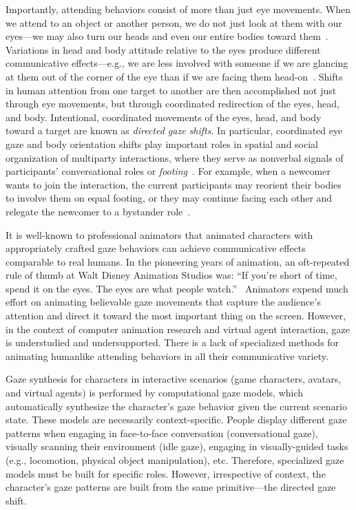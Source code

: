 Importantly, attending behaviors consist of more than just eye movements. When we attend to an object or another person, we do not just look at them with our eyes---we may also turn our heads and even our entire bodies toward them~\citep{langton2000eyes}. Variations in head and body attitude relative to the eyes produce different communicative effects---e.g., we are less involved with someone if we are glancing at them out of the corner of the eye than if we are facing them head-on~\citep{kendon1990conducting,schegloff1998bodytorque}.
Shifts in human attention from one target to another are then accomplished not just through eye movements, but through coordinated redirection of the eyes, head, and body. Intentional, coordinated movements of the eyes, head, and body toward a target are known as \emph{directed gaze shifts}.
In particular, coordinated eye gaze and body orientation shifts play important roles in spatial and social organization of multiparty interactions, where they serve as nonverbal signals of participants' conversational roles or \emph{footing}~\citep{goffman1979footing}. For example, when a newcomer wants to join the interaction, the current participants may reorient their bodies to involve them on equal footing, or they may continue facing each other and relegate the newcomer to a bystander role~\citep{kendon1990conducting}.

It is well-known to professional animators that animated characters with appropriately crafted gaze behaviors can achieve communicative effects comparable to real humans. In the pioneering years of animation, an oft-repeated rule of thumb at Walt Disney Animation Studios was: ``If you're short of time, spend it on the eyes. The eyes are what people watch.''~\citep{williams2009animator} Animators expend much effort on animating believable gaze movements that capture the audience's attention and direct it toward the most important thing on the screen.
However, in the context of computer animation research and virtual agent interaction, gaze is understudied and undersupported. There is a lack of specialized methods for animating humanlike attending behaviors in all their communicative variety.

Gaze synthesis for characters in interactive scenarios (game characters, avatars, and virtual agents) is performed by computational gaze models, which automatically synthesize the character's gaze behavior given the current scenario state.
These models are necessarily context-specific. People display different gaze patterns when engaging in face-to-face conversation (conversational gaze), visually scanning their environment (idle gaze), engaging in visually-guided tasks (e.g., locomotion, physical object manipulation), etc. Therefore, specialized gaze models must be built for specific roles.
However, irrespective of context, the character's gaze patterns are built from the same primitive---the directed gaze shift.

